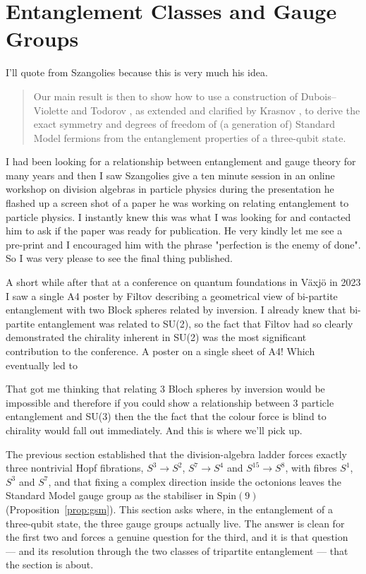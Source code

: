 \section{Entanglement Classes and Gauge Groups}
I'll quote from Szangolies \autocite{szangolies2025standardmodel} because this is very much his idea. 
\begin{quote}
Our main result is then to show how to use a construction of Dubois–Violette and Todorov \autocite{duboisviolette2016exceptional}, 
as extended and clarified by Krasnov \autocite{krasnov2021so9}, to derive the exact symmetry
and degrees of freedom of (a generation of) Standard Model fermions from the entanglement properties of a three-qubit state.
\end{quote}
I had been looking for a relationship between entanglement and gauge theory for many years and then I saw Szangolies 
give a ten minute session in an online workshop on division algebras in particle physics \autocite{szangolies_j_2021} 
during the presentation he flashed up a screen shot of a paper he was working on relating entanglement to particle physics.
I instantly knew this was what I was looking for and contacted him to ask if the paper was ready for publication. He very kindly let me
see a pre-print and I encouraged him with the phrase "perfection is the enemy of done". So I was very please to see the final thing published. 

A short while after that at a conference on quantum foundations in V\"axj\"o in 2023 I saw a single A4 poster by Filtov describing
a geometrical view of bi-partite entanglement with two Block spheres related by inversion. I already knew that bi-partite entanglement was 
related to SU(2), so the fact that Filtov had so clearly demonstrated the chirality inherent in SU(2) was the most significant 
contribution to the conference. A poster on a single sheet of A4! Which eventually led to \autocite{filatov2024towards}

That got me thinking that relating 3 Bloch spheres by inversion would be impossible and therefore if you could show a relationship between 3 particle entanglement and SU(3)
then the the fact that the colour force is blind to chirality would fall out immediately. And this is where we'll pick up. 

\label{sec:entanglement-classes}

The previous section established that the division-algebra ladder forces exactly three nontrivial
Hopf fibrations, $S^3 \to S^2$, $S^7 \to S^4$ and $S^{15} \to S^8$, with fibres $S^1$, $S^3$ and
$S^7$, and that fixing a complex direction inside the octonions leaves the Standard Model gauge
group as the stabiliser in $\mathrm{Spin}(9)$ (Proposition~\ref{prop:gsm}). This section asks where,
in the entanglement of a three-qubit state, the three gauge groups actually live. The answer is
clean for the first two and forces a genuine question for the third, and it is that question --- and
its resolution through the two classes of tripartite entanglement --- that the section is about.

